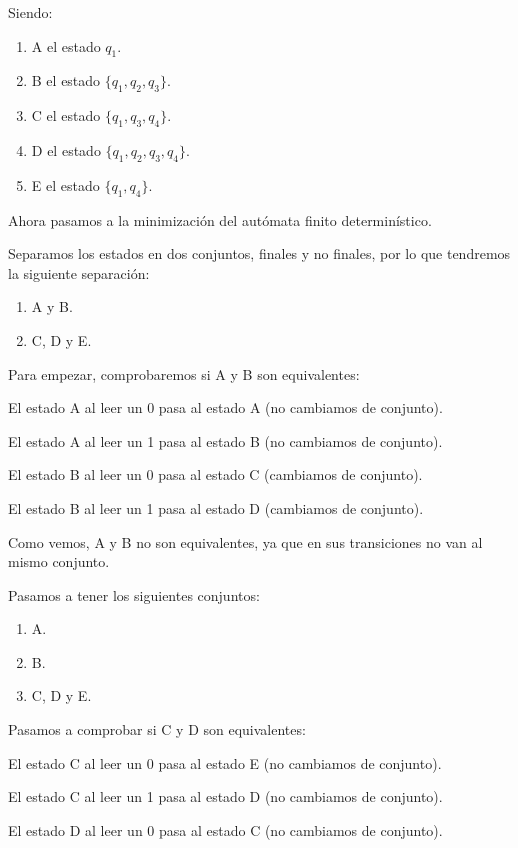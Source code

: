 \documentclass[12pt, spanish]{article}
\begin{document}
Siendo:

\begin{enumerate}
	\item A el estado $q_1$.
	\item B el estado $\{q_1, q_2, q_3\}$.
	\item C el estado $\{q_1, q_3, q_4\}$.
	\item D el estado $\{q_1, q_2, q_3, q_4\}$.
	\item E el estado $\{q_1, q_4\}$.
\end{enumerate}

Ahora pasamos a la minimización del autómata finito determinístico.

Separamos los estados en dos conjuntos, finales y no finales, por lo que tendremos la siguiente separación:

\begin{enumerate}
	\item A y B.
	\item C, D y E.

\end{enumerate}


Para empezar, comprobaremos si A y B son equivalentes:

El estado A al leer un 0 pasa al estado A (no cambiamos de conjunto).

El estado A al leer un 1 pasa al estado B (no cambiamos de conjunto).

El estado B al leer un 0 pasa al estado C (cambiamos de conjunto).

El estado B al leer un 1 pasa al estado D (cambiamos de conjunto).

Como vemos, A y B no son equivalentes, ya que en sus transiciones no van al mismo conjunto.

Pasamos a tener los siguientes conjuntos:

\begin{enumerate}
	\item A.
	\item B.
	\item C, D y E.

\end{enumerate}

Pasamos a comprobar si C y D son equivalentes:

El estado C al leer un 0 pasa al estado E (no cambiamos de conjunto).

El estado C al leer un 1 pasa al estado D (no cambiamos de conjunto).

El estado D al leer un 0 pasa al estado C (no cambiamos de conjunto).
\end{document}

